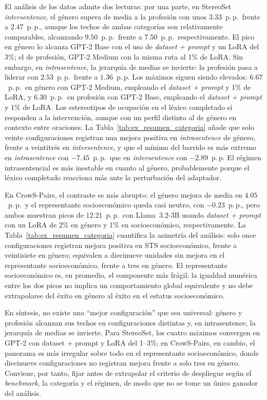 \documentclass[12pt,a4paper]{report}
\begin{document}
El análisis de los datos admite dos lecturas: por una parte, en StereoSet \textit{intersentence}, el género supera de media a la profesión con unos $3.33$~p.\,p.\ frente a $2.47$~p.\,p., aunque los techos de ambas categorías son relativamente comparables, alcanzando $9.50$~p.\,p.\ frente a $7.50$~p.\,p.\ respectivamente. El pico en género lo alcanza GPT-2 Base con el uso de \textit{dataset + prompt} y un LoRA del 3\%; el de profesión, GPT-2 Medium con la misma ruta al 1\% de LoRA. Sin embargo, en \textit{intrasentence}, la jerarquía de medias se invierte: la profesión pasa a liderar con $2.53$~p.\,p.\ frente a $1.36$~p.\,p. Los máximos siguen siendo elevados: $6.67$~p.\,p.\ en género con GPT-2 Medium, empleando el \textit{dataset + prompt} y 1\% de LoRA, y $6.30$~p.\,p.\ en profesión con GPT-2 Base, empleando el \textit{dataset + prompt} y 1\% de LoRA. Los estereotipos de ocupación en el léxico completado sí responden a la intervención, aunque con un perfil distinto al de género en contexto entre oraciones. La Tabla~\ref{tab:ex_resumen_categoria} añade que solo veinte configuraciones registran una mejora positiva en \textit{intrasentence} de género, frente a veintitrés en \textit{intersentence}, y que el mínimo del barrido es más extremo en \textit{intrasentence} con $-7.45$~p.\,p.\ que en \textit{intersentence} con $-2.89$~p.\,p. El régimen intrasentencial es más inestable en cuanto al género, probablemente porque el léxico completado reacciona más ante la perturbación del adaptador.

En CrowS-Pairs, el contraste es más abrupto: el género mejora de media en $4.05$~p.\,p.\ y el representante socioeconómico queda casi neutro, con $-0.23$~p.\,p., pero ambos muestran picos de $12.21$~p.\,p.\ con Llama~3.2-3B usando \textit{dataset + prompt} con un LoRA de 2\% en género y 1\% en socioeconómico, respectivamente. La Tabla~\ref{tab:ex_resumen_categoria} cuantifica la asimetría del análisis: solo once configuraciones registran mejora positiva en STS socioeconómico, frente a veintisiete en género; equivalen a diecinueve unidades sin mejora en el representante socioeconómico, frente a tres en género. El representante socioeconómico es, en promedio, el componente más frágil; la igualdad numérica entre los dos picos no implica un comportamiento global equivalente y no debe extrapolarse del éxito en género al éxito en el estatus socioeconómico.

En síntesis, no existe una “mejor configuración” que sea universal: género y profesión alcanzan sus techos en configuraciones distintas y, en intrasentence, la jerarquía de medias se invierte. Para StereoSet, los cuatro máximos convergen en GPT-2 con dataset + prompt y LoRA del 1--3\%; en CrowS-Pairs, en cambio, el panorama es más irregular sobre todo en el representante socioeconómico, donde diecinueve configuraciones no registran mejora frente a solo tres en género. Conviene, por tanto, fijar antes de extrapolar el criterio de despliegue según el \textit{benchmark}, la categoría y el régimen, de modo que no se tome un único ganador del análisis.
\end{document}
